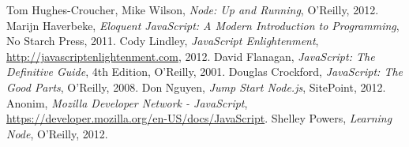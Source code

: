 \begin{thebibliography}{99}

Tom Hughes-Croucher, Mike Wilson, \textit{Node: Up and Running}, O'Reilly, 2012.
Marijn Haverbeke, \textit{Eloquent JavaScript: A Modern Introduction to Programming}, No Starch Press, 2011.
Cody Lindley, \textit{JavaScript Enlightenment}, \url{http://javascriptenlightenment.com}, 2012.
David Flanagan, \textit{JavaScript: The Definitive Guide}, 4th Edition, O'Reilly, 2001.
Douglas Crockford, \textit{JavaScript: The Good Parts}, O'Reilly, 2008.
Don Nguyen, \textit{Jump Start Node.js}, SitePoint, 2012.
Anonim, \textit{Mozilla Developer Network - JavaScript}, \url{https://developer.mozilla.org/en-US/docs/JavaScript}.
Shelley Powers, \textit{Learning Node}, O'Reilly, 2012.
\end{thebibliography}
